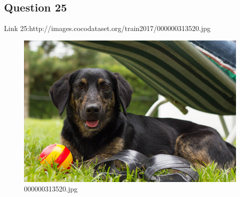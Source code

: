 \subsection*{Question 25}
Link 25:http://images.cocodataset.org/train2017/000000313520.jpg
    \begin{figure}[h]
        \centering
        \includegraphics[width=0.8\linewidth]{../image set/easy/000000313520.jpg}
        \caption{000000313520.jpg}
    \end{figure}
